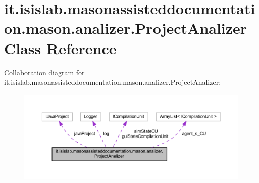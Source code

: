 \hypertarget{classit_1_1isislab_1_1masonassisteddocumentation_1_1mason_1_1analizer_1_1_project_analizer}{\section{it.\-isislab.\-masonassisteddocumentation.\-mason.\-analizer.\-Project\-Analizer Class Reference}
\label{classit_1_1isislab_1_1masonassisteddocumentation_1_1mason_1_1analizer_1_1_project_analizer}
}


Collaboration diagram for it.\-isislab.\-masonassisteddocumentation.\-mason.\-analizer.\-Project\-Analizer\-:\nopagebreak
\begin{figure}[H]
\begin{center}
\leavevmode
\includegraphics[width=350pt]{classit_1_1isislab_1_1masonassisteddocumentation_1_1mason_1_1analizer_1_1_project_analizer__coll__graph}
\end{center}
\end{figure}
